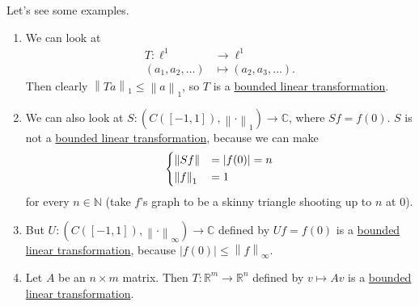 \begin{eg}
	Let's see some examples.
	\begin{enumerate}
		\item We can look at
		      \[
			      \begin{split}
				      T \colon \ell^1       & \to \ell^1                \\
				      (a_1,a_2,\ldots) & \mapsto (a_2,a_3,\ldots).
			      \end{split}
		      \]
		      Then clearly \(\left\lVert Ta\right\rVert_1 \leq \left\lVert a\right\rVert _1\), so \(T\) is a \hyperref[def:bounded-linear-transformation]{bounded linear transformation}.
		\item We can also look at \(S \colon (C([-1,1]),\left\lVert \cdot\right\rVert _1) \to \mathbb{C}\), where \(Sf = f(0)\). \(S\) is not a \hyperref[def:bounded-linear-transformation]{bounded linear transformation},
		      because we can make
		      \[
			      \begin{dcases}
				      \left\lVert Sf\right\rVert  & = \left\vert f(0) \right\vert  = n \\
				      \left\lVert f\right\rVert_1 & = 1
			      \end{dcases}
		      \]
		      for every \(n \in \mathbb{N}\) (take \(f\)'s graph to be a skinny triangle shooting up to \(n\) at \(0\)).
		\item But \(U \colon (C([-1,1]), \left\lVert \cdot\right\rVert _\infty) \to \mathbb{C}\) defined by \(Uf = f(0)\) is a \hyperref[def:bounded-linear-transformation]{bounded linear transformation},
		      because \(\left\vert f(0) \right\vert \leq \left\lVert f\right\rVert_\infty\).
		\item Let \(A\) be an \(n \times m\) matrix. Then \(T \colon \mathbb{R}^m \to \mathbb{R}^n\) defined by \(v \mapsto Av\) is a
		      \hyperref[def:bounded-linear-transformation]{bounded linear transformation}.


\end{enumerate}
\end{eg}
